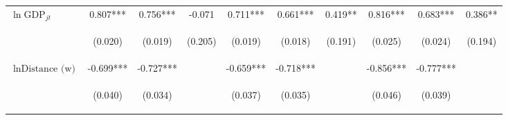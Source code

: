 \begin{center}
\begin{tabular}{lccccccccc}
$\ln\text{GDP}_{jt}$ & 0.807*** & 0.756*** & -0.071 & 0.711*** & 0.661*** & 0.419** & 0.816*** & 0.683*** & 0.386** \\
\vspace{4pt} & \begin{footnotesize}(0.020)\end{footnotesize} & \begin{footnotesize}(0.019)\end{footnotesize} & \begin{footnotesize}(0.205)\end{footnotesize} & \begin{footnotesize}(0.019)\end{footnotesize} & \begin{footnotesize}(0.018)\end{footnotesize} & \begin{footnotesize}(0.191)\end{footnotesize} & \begin{footnotesize}(0.025)\end{footnotesize} & \begin{footnotesize}(0.024)\end{footnotesize} & \begin{footnotesize}(0.194)\end{footnotesize} \\
$\ln\text{Distance (w)}$ & -0.699*** & -0.727*** &  & -0.659*** & -0.718*** &  & -0.856*** & -0.777*** &  \\
\vspace{4pt} & \begin{footnotesize}(0.040)\end{footnotesize} & \begin{footnotesize}(0.034)\end{footnotesize} & \begin{footnotesize}\end{footnotesize} & \begin{footnotesize}(0.037)\end{footnotesize} & \begin{footnotesize}(0.035)\end{footnotesize} & \begin{footnotesize}\end{footnotesize} & \begin{footnotesize}(0.046)\end{footnotesize} & \begin{footnotesize}(0.039)\end{footnotesize} & \begin{footnotesize}\end{footnotesize} \\

\end{tabular}
\end{center}
